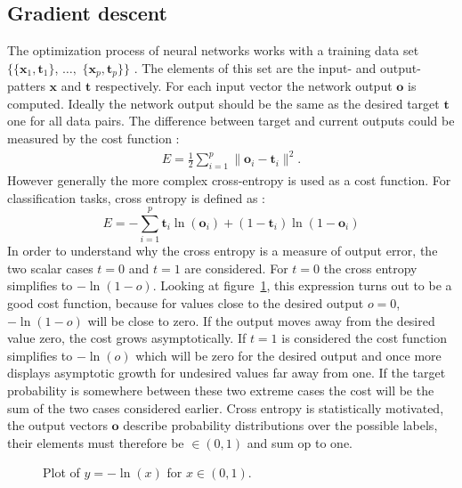 \subsection{Gradient descent}
The optimization process of neural networks works with a training data set $\{\{\mathbf{x}_1,\mathbf{t}_1\}$, $\dots ,$ $\{\mathbf{x}_p,\mathbf{t}_p\} \}$ \cite[page 156]{Rojas1996}. The elements of this set are the input- and output-patters $\mathbf{x}$ and $\mathbf{t}$ respectively. For each input vector the network output $\mathbf{o}$ is computed. Ideally the network output should be the same as the desired target $\mathbf{t}$ one for all data pairs. The difference between target and current outputs could be measured by the cost function \cite[page 156]{Rojas1996}:
\begin{align}
E = \frac{1}{2}\sum\limits_{i=1}^{p} \| \mathbf{o}_i - \mathbf{t}_i \|^2.
\end{align}
However generally the more complex cross-entropy is used as a cost function. For classification tasks, cross entropy is defined as \cite[page 245]{Bishop1995}:
\begin{equation}
E = - \sum\limits_{i=1}^{p} {\mathbf{t}_i \ln(\mathbf{o}_i)} + (1 - \mathbf{t}_i)\ln(1 - \mathbf{o}_i)
\label{eq:corssEntropy}
\end{equation}
In order to understand why the cross entropy is a measure of output error, the two scalar cases $t=0$ and $t=1$ are considered. For $t = 0$ the cross entropy simplifies to $-\ln(1 - o)$. Looking at figure~\ref{fig:logPlot}, this expression turns out to be a good cost function, because for values close to the desired output $o = 0$, $-\ln(1 - o)$ will be close to zero. If the output moves away from the desired value zero, the cost grows asymptotically. If $t = 1$ is considered the cost function simplifies to $-\ln(o)$ which will be zero for the desired output and once more displays asymptotic growth for undesired values far away from one. If the target probability is somewhere between these two extreme cases the cost will be the sum of the two cases considered earlier. Cross entropy is statistically motivated, the output vectors $\mathbf{o}$ describe probability distributions over the possible labels, their elements must therefore be $\in (0,1)$ and sum op to one.
\begin{figure}
\centering

\caption{Plot of $y = -\ln(x)$ for $x \in (0,1)$.}
\label{fig:logPlot}
\end{figure}

